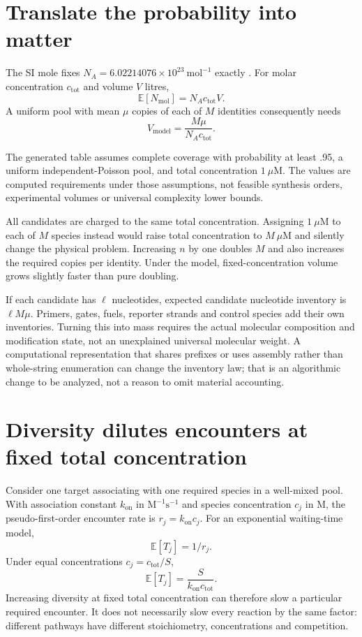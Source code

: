 \section{Translate the probability into matter}
The SI mole fixes $N_A=6.02214076\times10^{23}\ \mathrm{mol}^{-1}$ exactly
\cite{BIPMmole}. For molar concentration $c_{\mathrm{tot}}$ and volume $V$ litres,
\[
\mathbb E[N_{\mathrm{mol}}]=N_Ac_{\mathrm{tot}}V.
\]
A uniform pool with mean $\mu$ copies of each of $M$ identities consequently needs
\begin{equation}
V_{\mathrm{model}}=\frac{M\mu}{N_Ac_{\mathrm{tot}}}.
\label{dnad24:volume}
\end{equation}
\begin{center}\small\end{center}
The generated table assumes complete coverage with probability at least .95,
a uniform independent-Poisson pool, and total concentration $1\ \mu\mathrm M$.
The values are computed requirements under those assumptions, not feasible
synthesis orders, experimental volumes or universal complexity lower bounds.

All candidates are charged to the same total concentration. Assigning
$1\ \mu\mathrm M$ to each of $M$ species instead would raise total concentration
to $M\ \mu\mathrm M$ and silently change the physical problem. Increasing $n$ by
one doubles $M$ and also increases the required copies per identity. Under the
model, fixed-concentration volume grows slightly faster than pure doubling.

If each candidate has $\ell$ nucleotides, expected candidate nucleotide inventory
is $\ell M\mu$. Primers, gates, fuels, reporter strands and control species add
their own inventories. Turning this into mass requires the actual molecular
composition and modification state, not an unexplained universal molecular weight.
A computational representation that shares prefixes or uses assembly rather than
whole-string enumeration can change the inventory law; that is an algorithmic
change to be analyzed, not a reason to omit material accounting.

\section{Diversity dilutes encounters at fixed total concentration}
Consider one target associating with one required species in a well-mixed pool.
With association constant $k_{\mathrm{on}}$ in
$\mathrm{M}^{-1}\mathrm{s}^{-1}$ and species concentration $c_j$ in M,
the pseudo-first-order encounter rate is $r_j=k_{\mathrm{on}}c_j$.
For an exponential waiting-time model,
\[
\mathbb E[T_j]=1/r_j.
\]
Under equal concentrations $c_j=c_{\mathrm{tot}}/S$,
\begin{equation}
\mathbb E[T_j]=\frac{S}{k_{\mathrm{on}}c_{\mathrm{tot}}}.
\label{dnad24:wait}
\end{equation}
Increasing diversity at fixed total concentration can therefore slow a particular
required encounter. It does not necessarily slow every reaction by the same factor:
different pathways have different stoichiometry, concentrations and competition.

